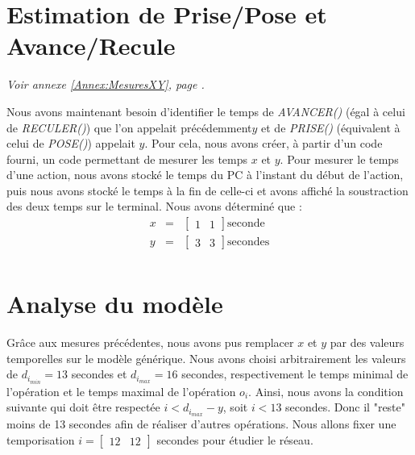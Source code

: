 \section{Estimation de Prise/Pose et Avance/Recule}
\begin{center}
\textit{Voir annexe \ref{Annex:MesuresXY}, page \pageref{Annex:MesuresXY}.}
\end{center}
Nous avons maintenant besoin d'identifier le temps de \emph{AVANCER()} (égal à celui de \emph{RECULER()}) que l'on appelait précédemment$y$  et de \emph{PRISE()} (équivalent à celui de \emph{POSE()}) appelait $y$. Pour cela, nous avons créer, à partir d'un code fourni, un code permettant de mesurer les temps $x$ et $y$. Pour mesurer le temps d'une action, nous avons stocké le temps du PC à l'instant du début de l'action, puis nous avons stocké le temps à la fin de celle-ci et avons affiché la soustraction des deux temps sur le terminal. 
Nous avons déterminé que :
\begin{eqnarray}
x &=& \begin{bmatrix}
1 & 1
\end{bmatrix} \text{seconde}\\
y &=& \begin{bmatrix}
3 & 3
\end{bmatrix} \text{secondes}\\
\end{eqnarray}
\section{Analyse du modèle}
Grâce aux mesures précédentes, nous avons pus remplacer $x$ et $y$ par des valeurs temporelles sur le modèle générique. Nous avons choisi arbitrairement les valeurs de $d_{i_{min}} = 13$ secondes et $d_{i_{max}} = 16$ secondes, respectivement le temps minimal de l'opération et le temps maximal de l'opération $o_i$.  Ainsi, nous avons la condition suivante qui doit être respectée $i <d_{i_{max}}-y$, soit $i < 13$ secondes. Donc il "reste" moins de 13 secondes afin de réaliser d'autres opérations. Nous allons fixer une temporisation  $i=\begin{bmatrix}
12& 12
\end{bmatrix}$ secondes pour étudier le réseau. 

